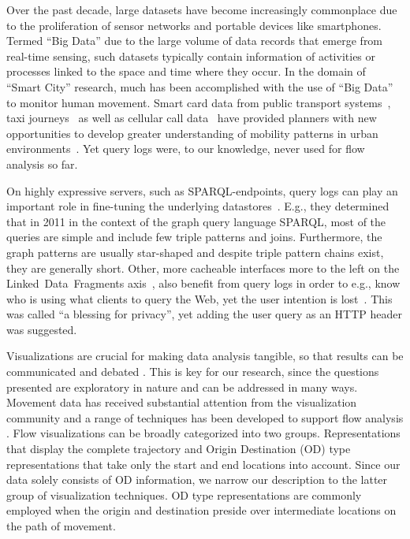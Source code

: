 \documentclass{sig-alternate}
\newcommand{\sparql}{{SPARQL}\xspace}
\begin{document}
Over the past decade, large datasets have become increasingly commonplace due to the proliferation of sensor networks and portable devices like smartphones.
Termed ``Big Data'' due to the large volume of data records that emerge from real-time sensing\cite{kitchin}, such datasets typically contain information of activities or processes linked to the space and time where they occur.
In the domain of ``Smart City'' research, much has been accomplished with the use of ``Big Data'' to monitor human movement.
Smart card data from public transport systems~\cite{roth,beecham}, taxi journeys~\cite{ferreira} as well as cellular call data~\cite{sevtsuk} have provided planners with new opportunities to develop greater understanding of mobility patterns in urban environments~\cite{batty}.
Yet query logs were, to our knowledge, never used for flow analysis so far.

On highly expressive servers, such as \sparql-endpoints, query logs can play an important role in fine-tuning the underlying datastores~\cite{arias2011empirical}.
E.g., they determined that in 2011 in the context of the graph query language \sparql, most of the queries are simple and include few triple patterns and joins.
Furthermore, the graph patterns are usually star-shaped and despite triple pattern chains exist, they are generally short.
Other, more cacheable interfaces more to the left on the Linked~Data~Fragments axis~\cite{ldf}, also benefit from query logs in order to e.g., know who is using what clients to query the Web, yet the user intention is lost~\cite{usewod2015}.
This was called ``a blessing for privacy'', yet adding the user query as an HTTP header was suggested.

Visualizations are crucial for making data analysis tangible, so that results can be communicated and debated \cite{robinson2008collaborative}. 
This is key for our research, since the questions presented are exploratory in nature \cite{kraak2008exploratory} and can be addressed in many ways. 
Movement data has received substantial attention from the visualization community and a range of techniques has been developed to support flow analysis \cite{andrienko2012visual}. 
Flow visualizations can be broadly categorized into two groups. 
Representations that display the complete trajectory and Origin Destination (OD) type representations that take only the start and end locations into account.
Since our data solely consists of OD information, we narrow our description to the latter group of visualization techniques.
OD type representations are commonly employed when the origin and destination preside over intermediate locations on the path of movement. 
\end{document}
